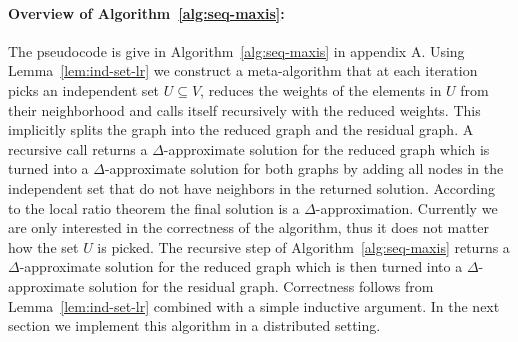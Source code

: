 \documentclass[11pt]{article}
\begin{document}
\paragraph{Overview of Algorithm~\ref{alg:seq-maxis}:} The pseudocode is give in Algorithm~\ref{alg:seq-maxis} in appendix A. Using Lemma~\ref{lem:ind-set-lr} we construct a meta-algorithm that at each iteration picks an independent set $U \subseteq V$, reduces the weights of the elements in $U$ from their neighborhood and calls itself recursively with the reduced weights. This implicitly splits the graph into the reduced graph and the residual graph. A recursive call returns a $\Delta$-approximate solution for the reduced graph which is turned into a $\Delta$-approximate solution for both graphs by adding all nodes in the independent set that do not have neighbors in the returned solution. According to the local ratio theorem the final solution is a $\Delta$-approximation. Currently we are only interested in the correctness of the algorithm, thus it does not matter how the set $U$ is picked.
\LinesNumbered
\newcommand{\SeqAlgMaxIS}
{
\begin{algorithm}[htbp]
	\label{alg:seq-maxis}
	\caption{\texttt{SeqLR}($V,E,w$) - Sequential LR algorithm for maximum independent set}
	\footnotesize
	\If{$V=\emptyset$}{Return $\emptyset$}
	\ForEach{$v \in V$}{
	\If{$w(v) \leq 0 $}
	{
		$V = V \setminus \{v \}$\\
		$E = E \setminus \{(v,u) \mid u \in V \}$	
	}
	}
	Let $U \subseteq V$ be an independent set\\
	Let $w_1=w$ \\
	\ForEach{$u \in U$}{
		\ForEach{$v \in N(u)$}
		{
			$w_1(v) = w(v) - w(u)$	\\
		}		
	}
	$R =$ \texttt{SeqLR}($V,E,w_1$)\\
	$U = U \setminus \bigcup_{v \in R} N(v)$
	
	Return $R \cup U$\\
\end{algorithm}
}
The recursive step of Algorithm~\ref{alg:seq-maxis} returns a $\Delta$-approximate solution for the reduced graph which is then turned into a $\Delta$-approximate solution for the residual graph. Correctness follows from Lemma~\ref{lem:ind-set-lr} combined with a simple inductive argument. In the next section we implement this algorithm in a distributed setting.
\end{document}
